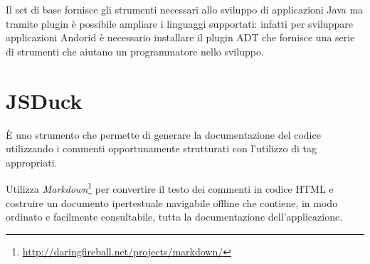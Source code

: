 Il set di base fornisce gli strumenti necessari allo sviluppo di applicazioni Java ma tramite plugin è possibile ampliare i linguaggi supportati: infatti per sviluppare applicazioni Andorid è necessario installare il plugin \ac{ADT} che fornisce una serie di strumenti che aiutano un programmatore nello sviluppo.

\section{JSDuck}
È uno strumento che permette di generare la documentazione del codice utilizzando i commenti opportunamente strutturati con l'utilizzo di tag appropriati.

Utilizza \emph{Markdown}\footnote{\url{http://daringfireball.net/projects/markdown/}} per convertire il testo dei commenti in codice \ac{HTML} e costruire un documento ipertestuale navigabile offline che contiene, in modo ordinato e facilmente consultabile, tutta la documentazione dell'applicazione.